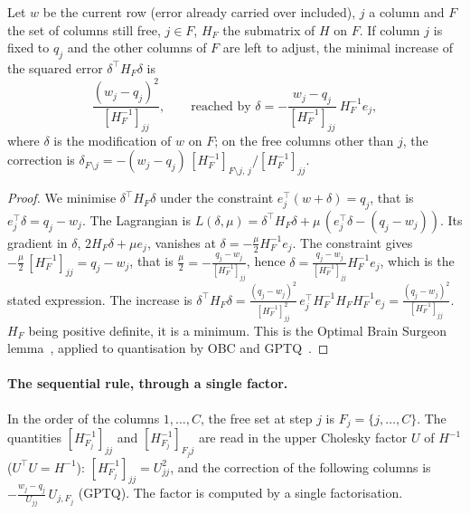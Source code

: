 \begin{lemme}\label{t3ecl:lem:obs}
Let $w$ be the current row (error already carried over included), $j$ a column and $F$ the set of columns still free, $j \in F$, $H_F$ the submatrix of $H$ on $F$. If column $j$ is fixed to $q_j$ and the other columns of $F$ are left to adjust, the minimal increase of the squared error $\delta^\top H_F \delta$ is
\begin{equation}\label{t3ecl:eq:obs}
\frac{(w_j - q_j)^2}{[H_F^{-1}]_{jj}}, \qquad \text{reached by } \delta = -\frac{w_j - q_j}{[H_F^{-1}]_{jj}}\ H_F^{-1} e_j ,
\end{equation}
where $\delta$ is the modification of $w$ on $F$; on the free columns other than $j$, the correction is $\delta_{F\setminus j} = -(w_j - q_j)\,[H_F^{-1}]_{F\setminus j,\,j} / [H_F^{-1}]_{jj}$.
\end{lemme}

\begin{proof}
We minimise $\delta^\top H_F \delta$ under the constraint $e_j^\top (w + \delta) = q_j$, that is $e_j^\top \delta = q_j - w_j$. The Lagrangian is $L(\delta, \mu) = \delta^\top H_F \delta + \mu\,(e_j^\top \delta - (q_j - w_j))$. Its gradient in $\delta$, $2 H_F \delta + \mu e_j$, vanishes at $\delta = -\frac{\mu}{2} H_F^{-1} e_j$. The constraint gives $-\frac{\mu}{2}\,[H_F^{-1}]_{jj} = q_j - w_j$, that is $\frac{\mu}{2} = -\frac{q_j - w_j}{[H_F^{-1}]_{jj}}$, hence $\delta = \frac{q_j - w_j}{[H_F^{-1}]_{jj}} H_F^{-1} e_j$, which is the stated expression. The increase is $\delta^\top H_F \delta = \frac{(q_j - w_j)^2}{[H_F^{-1}]_{jj}^2}\, e_j^\top H_F^{-1} H_F H_F^{-1} e_j = \frac{(q_j - w_j)^2}{[H_F^{-1}]_{jj}}$. $H_F$ being positive definite, it is a minimum. This is the Optimal Brain Surgeon lemma~\cite{hassibi1992obs}, applied to quantisation by OBC and GPTQ~\cite{frantar2022obc,frantar2022gptq}.
\end{proof}

\paragraph{The sequential rule, through a single factor.} In the order of the columns $1, \ldots, C$, the free set at step $j$ is $F_j = \{j, \ldots, C\}$. The quantities $[H_{F_j}^{-1}]_{jj}$ and $[H_{F_j}^{-1}]_{F_j j}$ are read in the upper Cholesky factor $U$ of $H^{-1}$ ($U^\top U = H^{-1}$): $[H_{F_j}^{-1}]_{jj} = U_{jj}^2$, and the correction of the following columns is $-\frac{w_j - q_j}{U_{jj}}\, U_{j, F_j}$ (GPTQ). The factor is computed by a single factorisation.

